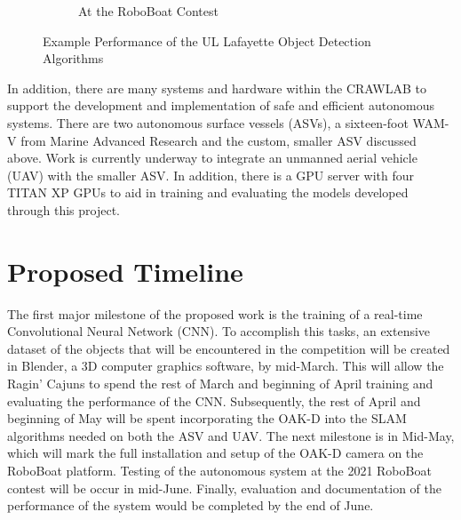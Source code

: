 \documentclass[12 pt]{article}
\begin{document}
\begin{figure}[tb]
\begin{subfigure}{0.48\columnwidth}
    \caption{At the RoboBoat Contest}
    \label{fig:RoboBoat_example}
    \end{subfigure}
\caption{Example Performance of the UL Lafayette Object Detection Algorithms} %
\label{fig:detection_examples}	%
\end{figure}
%

In addition, there are many systems and hardware within the CRAWLAB to support the development and implementation of safe and efficient autonomous systems. There are two autonomous surface vessels (ASVs), a sixteen-foot WAM-V from Marine Advanced Research and the custom, smaller ASV discussed above. Work is currently underway to integrate an unmanned aerial vehicle (UAV) with the smaller ASV. In addition, there is a GPU server with four TITAN XP GPUs to aid in training and evaluating the models developed through this project.


\section{Proposed Timeline}
\label{sec:timeline}
\vspace{-0.2in}
%
The first major milestone of the proposed work is the training of a real-time Convolutional Neural Network (CNN). To accomplish this tasks, an extensive dataset of the objects that will be encountered in the competition will be created in Blender, a 3D computer graphics software, by mid-March. This will allow the Ragin' Cajuns to spend the rest of March and beginning of April training and evaluating the performance of the CNN. Subsequently, the rest of April and beginning of May will be spent incorporating the OAK-D into the SLAM algorithms needed on both the ASV and UAV. The next milestone is in Mid-May, which will mark the full installation and setup of the OAK-D camera on the RoboBoat platform. Testing of the autonomous system at the 2021 RoboBoat contest will be occur in mid-June. Finally, evaluation and documentation of the performance of the system would be completed by the end of June. 

\end{document}
